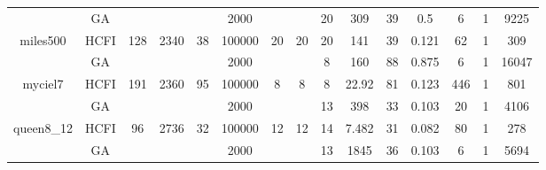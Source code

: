 \documentclass[10pt]{article}
\begin{document}
\begin{center}
\begin{table}[H]
\begin{tabular}{|c|c|c|c|c|c|c|c|c|c|c|c|c|c|c|}
	&GA&       &                   &                     &2000         &     \cellcolor{yellow} & {\cellcolor{yellow}}& {{\cellcolor{green}20}}
&309   &39        & 0.5                  & 6                   &1          &9225        \\ \cline{2-2} \cline{6-6} \cline{9-15}
 \multirow{-2}{*}{miles500} &HCFI   &\multirow{-2}{*}{128}   &\multirow{-2}{*}{2340}     &\multirow{-2}{*}{38}     &100000     &\multirow{-2}{*}{\cellcolor{yellow}20}      & \multirow{-2}{*}{\cellcolor{yellow}20}    &{\cellcolor{green}20}     &141         &39    &0.121         &62    &1     &309        \\ \hline \hline
	&GA&       &                   &                     &  2000       &     \cellcolor{yellow} & {\cellcolor{yellow}}& {{\cellcolor{green}8}}
&160   & 88       &0.875                   &6                    &1          &16047        \\ \cline{2-2} \cline{6-6} \cline{9-15}
 \multirow{-2}{*}{myciel7} &HCFI   &\multirow{-2}{*}{191}   &\multirow{-2}{*}{2360}     &\multirow{-2}{*}{95}     &100000     &\multirow{-2}{*}{\cellcolor{yellow}8}      & \multirow{-2}{*}{\cellcolor{yellow}8}    &{\cellcolor{green}8}     &22.92         &81    &0.123         &446    &1     &801        \\ \hline \hline
	&GA&       &                   &                     &    2000     &     \cellcolor{yellow} & {\cellcolor{yellow}}& {{\cellcolor{green}13}}
& 398   & 33       &0.103                   &20                    &1          &4106        \\ \cline{2-2} \cline{6-6} \cline{9-15}
 \multirow{-2}{*}{queen8\_12} &HCFI   &\multirow{-2}{*}{96}   &\multirow{-2}{*}{2736}     &\multirow{-2}{*}{32}     &100000     &\multirow{-2}{*}{\cellcolor{yellow}12}      & \multirow{-2}{*}{\cellcolor{yellow}12}    &{\cellcolor{green}14}     &7.482         &31     & 0.082         &80    &1     &278         \\ \hline \hline
	&GA&       &                   &                     &     2000    &     \cellcolor{yellow} & {\cellcolor{yellow}}& {{\cellcolor{green}13}}
&1845   &36        & 0.103                   & 6                   & 1         &5694         \\ \cline{2-2} \cline{6-6} \cline{9-15}

\end{tabular}
\end{table}
\end{center}
\end{document}
